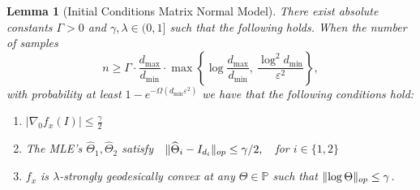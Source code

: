 \documentclass[aos]{imsart}
\newtheorem{lemma}[theorem]{Lemma}
\theoremstyle{definition}
\numberwithin{equation}{section}
\DeclarePairedDelimiter{\norm}{\lVert}{\rVert}
\newcommand{\htheta}{\widehat{\Theta}}
\newcommand{\SPD}{\mathbb{P}}
\def\dmin{d_{\min}}
\def\dmax{d_{\max}}
\begin{document}
\begin{lemma}[Initial Conditions Matrix Normal Model]\label{lem:matrix-normal-initial-conditions}
There exist absolute constants $\Gamma > 0$ and $\gamma, \lambda \in (0,1]$ such that the following holds.
	When the number of samples 
	$$n \geq \Gamma \cdot \dfrac{\dmax}{\dmin} \cdot \max\left\{ \log \dfrac{\dmax}{\dmin}, \ \dfrac{\log^2 \dmin}{\varepsilon^2}  \right\},$$ 
	with probability at least $1 - e^{- \Omega(\dmin \varepsilon^2)}$ we have that the following conditions hold:
	\begin{enumerate}
		\item $|\nabla_0 f_x(I)| \leq \frac{\gamma}{2}$
		\item The MLE's $\htheta_1, \htheta_2$ satisfy $\ \ \norm{\htheta_i - I_{d_i}}_{op} \leq \gamma/2, \ \ $ for $i \in \{1,2\}$
		\item $f_x$ is $\lambda$-strongly geodesically convex at any $\Theta \in \SPD$ such that $\norm{\log \Theta}_{op} \leq \gamma$.
	\end{enumerate}
\end{lemma}
\end{document}
